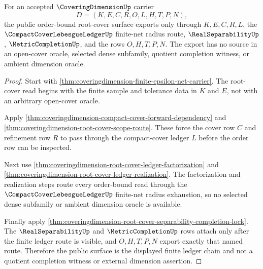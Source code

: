 \begin{theorem}
\label{thm:coveringdimension-public-root-cover-export}
For an accepted $\CoveringDimensionUp$ carrier
$$
D=(K,E,C,R,O,L,H,T,P,N),
$$
the public order-bound root-cover surface exports only through $K,E,C,R,L$, the $\CompactCoverLebesgueLedgerUp$ finite-net radius route, $\RealSeparabilityUp$, $\MetricCompletionUp$, and the rows $O,H,T,P,N$. The export has no source in an open-cover oracle, selected dense subfamily, quotient completion witness, or ambient dimension oracle.
\end{theorem}
\begin{proof}
Start with \autoref{thm:coveringdimension-finite-epsilon-net-carrier}. The root-cover read begins with the finite sample and tolerance data in $K$ and $E$, not with an arbitrary open-cover oracle.

Apply \autoref{thm:coveringdimension-compact-cover-forward-dependency} and \autoref{thm:coveringdimension-root-cover-scope-route}. These force the cover row $C$ and refinement row $R$ to pass through the compact-cover ledger $L$ before the order row can be inspected.

Next use \autoref{thm:coveringdimension-root-cover-ledger-factorization} and \autoref{thm:coveringdimension-root-cover-ledger-realization}. The factorization and realization steps route every order-bound read through the $\CompactCoverLebesgueLedgerUp$ finite-net radius exhaustion, so no selected dense subfamily or ambient dimension oracle is available.

Finally apply \autoref{thm:coveringdimension-root-cover-separability-completion-lock}. The $\RealSeparabilityUp$ and $\MetricCompletionUp$ rows attach only after the finite ledger route is visible, and $O,H,T,P,N$ export exactly that named route. Therefore the public surface is the displayed finite ledger chain and not a quotient completion witness or external dimension assertion.
\end{proof}
